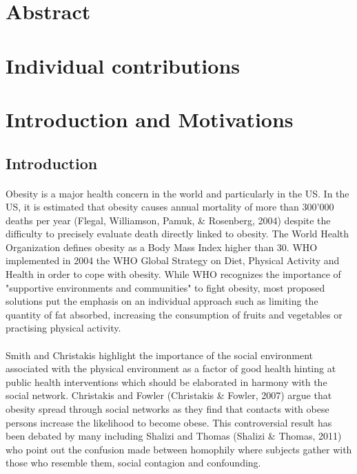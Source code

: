 \documentclass[11pt]{article}
\begin{document}
\section{Abstract}


\section{Individual contributions}


\section{Introduction and Motivations}

\subsection{Introduction}
\paragraph{}
Obesity is a major health concern in the world and particularly in the US. In the US, it is estimated that obesity causes annual mortality of more than 300'000 deaths per year (Flegal, Williamson, Pamuk, & Rosenberg, 2004) despite the difficulty to precisely evaluate death directly linked to obesity. The World Health Organization defines obesity as a Body Mass Index higher than 30. WHO implemented in 2004 the WHO Global Strategy on Diet, Physical Activity and Health in order to cope with obesity. While WHO recognizes the importance of "supportive environments and communities" to fight obesity, most proposed solutions put the emphasis on an individual approach such as limiting the quantity of fat absorbed, increasing the consumption of fruits and vegetables or practising physical activity. 

\paragraph{}
Smith and Christakis  highlight the importance of the social environment associated with the physical environment as a factor of good health hinting at public health interventions which should be elaborated in harmony with the social network. Christakis and Fowler (Christakis & Fowler, 2007) argue that obesity spread  through social networks as they find that contacts with obese persons increase the likelihood to become obese. This controversial result has been debated by many including Shalizi and Thomas (Shalizi & Thomas, 2011) who point out the confusion made between homophily where subjects gather with those who resemble them, social contagion and confounding.
\end{document}
